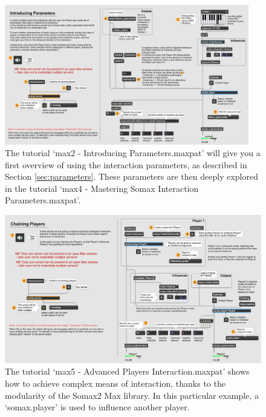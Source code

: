 \begin{figure}[H]
    \centering        
 	\includegraphics[width=0.95\textwidth]{img/parameters_tuto.png}
    \caption{The tutorial `max2 - Introducing Parameters.maxpat' will give you a first overview of using the interaction parameters, as described in Section \ref{sec:parameters}. These parameters are then deeply explored in the tutorial `max4 - Mastering Somax Interaction Parameters.maxpat'.}
    \label{fig:parameters_tuto}
\end{figure}

\begin{figure}[H]
    \centering        
 	\includegraphics[width=1\textwidth]{img/chaining_players_tuto.png}
    \caption{The tutorial `max5 - Advanced Players Interaction.maxpat' shows how to achieve complex means of interaction, thanks to the modularity of the Somax2 Max library. In this particular example, a `somax.player' is used to influence another player.}
    \label{fig:chaining_players_tuto}
\end{figure}

